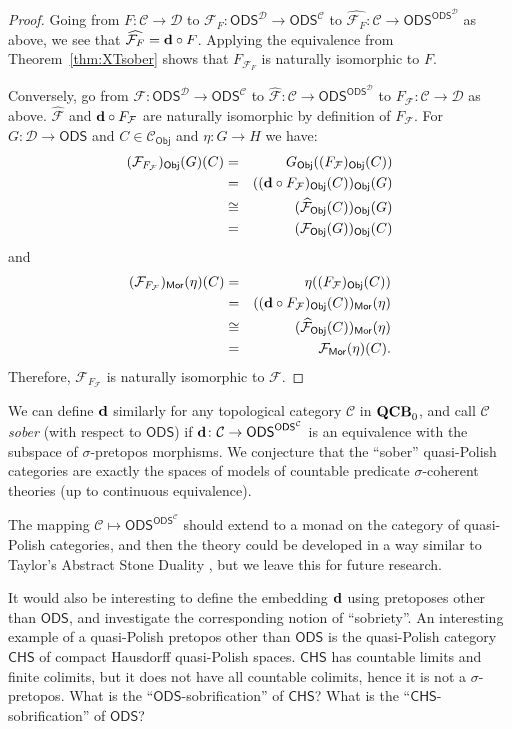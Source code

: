 \documentclass{article}
\theoremstyle{plain}
\def\cal#1{{\mathcal #1}}
\def\QCB{{{\bf QCB}_0}}
\def\calC{{\cal C}}
\def\calD{{\cal D}}
\def\calF{{\cal F}}
\newcommand{\ODS}{{\mathsf{ODS}}}
\newcommand{\CHS}{{\mathsf{CHS}}}
\def\QCB{{{\bf QCB}_0}}
\newcommand{\y}{{\mathsf{\bf d}}}
\newcommand{\Mor}{\mathsf{Mor}}
\newcommand{\Obj}{\mathsf{Obj}}
\begin{document}
\begin{proof}
Going from $F\colon \calC\to\calD$ to $\calF_F\colon\ODS^\calD \to \ODS^\calC$ to $\widehat{\calF_F}\colon \calC\to \ODS^{\ODS^\calD}$ as above, we see that $\widehat{\calF_F} = \y\circ F$. Applying the equivalence from Theorem~\ref{thm:XTsober} shows that $F_{\calF_F}$ is naturally isomorphic to $F$.

Conversely, go from $\calF\colon\ODS^\calD \to \ODS^\calC$ to $\widehat{\calF}\colon \calC\to \ODS^{\ODS^\calD}$ to $F_\calF\colon \calC\to\calD$ as above. $\widehat{\calF}$ and $\y\circ F_\calF$ are naturally isomorphic by definition of $F_\calF$. For $G\colon \calD\to\ODS$ and $C\in\calC_\Obj$ and $\eta\colon G\to H$ we have:
\begin{eqnarray*}
(\calF_{F_\calF})_\Obj(G)(C) &=& G_\Obj((F_\calF)_\Obj(C))\\
&=& ((\y\circ F_\calF)_\Obj(C))_\Obj(G)\\
&\cong& (\widehat{\calF}_\Obj(C))_\Obj(G)\\
&=& (\calF_\Obj(G))_\Obj(C)
\end{eqnarray*}
and
\begin{eqnarray*}
(\calF_{F_\calF})_\Mor(\eta)(C) &=& \eta((F_\calF)_\Obj(C))\\
&=& ((\y\circ F_\calF)_\Obj(C))_\Mor(\eta)\\
&\cong& (\widehat{\calF}_\Obj(C))_\Mor(\eta)\\
&=& \calF_\Mor(\eta)(C).
\end{eqnarray*}
Therefore, $\calF_{F_\calF}$ is naturally isomorphic to $\calF$.
\end{proof}

We can define $\y$ similarly for any topological category $\calC$ in $\QCB$, and call $\calC$ \emph{sober} (with respect to $\ODS$) if $\y\colon \calC \to \ODS^{\ODS^\calC}$ is an equivalence with the subspace of $\sigma$-pretopos morphisms. We conjecture that the ``sober'' quasi-Polish categories are exactly the spaces of models of countable predicate $\sigma$-coherent theories (up to continuous equivalence). 

The mapping $\calC \mapsto \ODS^{\ODS^\calC}$ should extend to a monad on the category of quasi-Polish categories, and then the theory could be developed in a way similar to Taylor's Abstract Stone Duality \cite{Taylor02}, but we leave this for future research.

It would also be interesting to define the embedding $\y$ using pretoposes other than $\ODS$, and investigate the corresponding notion of ``sobriety''. An interesting example of a quasi-Polish pretopos other than $\ODS$ is the quasi-Polish category $\CHS$ of compact Hausdorff quasi-Polish spaces. $\CHS$ has countable limits and finite colimits, but it does not have all countable colimits, hence it is not a $\sigma$-pretopos. What is the ``$\ODS$-sobrification'' of $\CHS$? What is the ``$\CHS$-sobrification'' of $\ODS$?
\end{document}
